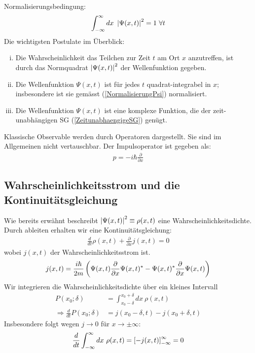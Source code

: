 Normalisierungsbedingung:
\begin{align}\label{NormalisierungPsi}
    \int_{-\infty}^\infty dx \ \left\vert \Psi(x,t) \right\vert^2 = 1 \ \forall t
\end{align}
Die wichtigsten Postulate im Überblick:
\begin{enumerate}[(i)]
    \item Die Wahrscheinlichkeit das Teilchen zur Zeit $t$ am Ort $x$
        anzutreffen, ist durch das Normquadrat $\left\vert \Psi(x,t) \right\vert^2$ der
        Wellenfunktion gegeben.
    \item Die Wellenfunktion $\Psi(x,t)$ ist für jedes $t$ quadrat-integrabel
        in $x$; insbesondere ist sie gemässt (\ref{NormalisierungPsi}) normalisiert.
    \item Die Wellenfunktion $\Psi(x,t)$ ist eine komplexe Funktion, die der
        zeit-unabhängigen SG (\ref{ZeitunabhaengigeSG}) genügt.
\end{enumerate}

Klassische Observable werden durch Operatoren dargestellt. Sie sind im
Allgemeinen nicht vertauschbar. Der Impulsoperator ist gegeben als:
\begin{align*}
    p = -i \hbar \frac{\partial}{\partial x}
\end{align*}

\subsection{Wahrscheinlichkeitsstrom und die Kontinuitätsgleichung}

Wie bereits erwähnt beschreibt $\left\vert \Psi(x,t) \right\vert^2 \equiv \rho(x,t)$ eine
Wahrscheinlichkeitsdichte. Durch ableiten erhalten wir eine Kontinuitätsgleichung:
\begin{align*}
    \frac{d}{dt} \rho(x,t) + \frac{\partial}{\partial x} j(x,t) = 0
\end{align*}
wobei $j(x,t)$ der Wahrscheinlichkeitsstrom ist.
\begin{align*}
    j(x,t) = \frac{i \hbar}{2m} \left( 
        \Psi(x,t) \frac{\partial}{\partial x} \Psi(x,t)^\ast
        - \Psi(x,t)^\ast \frac{\partial}{\partial x} \Psi(x,t)
     \right)
\end{align*}
Wir integrieren die Wahrscheinlichkeitsdichte über ein kleines Intervall
\begin{align*}
    P(x_0;\delta) &= \int_{x_0 - \delta}^{x_0 + \delta} dx \ \rho(x,t)
    \\ \Rightarrow
    \frac{d}{dt} P(x_0;\delta)
    &= j(x_0 - \delta,t) - j(x_0 + \delta,t)
\end{align*}
Insbesondere folgt wegen $j \rightarrow 0$ für $x \rightarrow \pm \infty$:
\begin{align*}
    \frac{d}{dt} \int_{-\infty}^\infty dx \ \rho(x,t)
    = \left[ - j(x,t) \right]_{-\infty}^\infty
    = 0
\end{align*}

